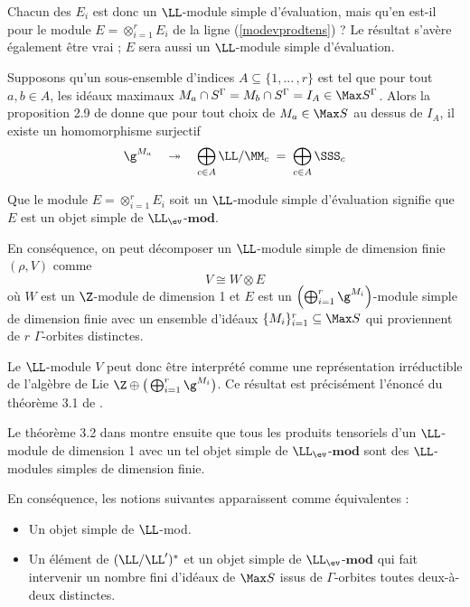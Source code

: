 Chacun des $E_i$ est donc un $\LL$-module simple d'évaluation, mais qu'en est-il pour le module $E = \otimes_{i=1}^r E_i$ de la ligne (\ref{modevprodtens}) ? Le résultat s'avère également être vrai ; $E$ sera aussi un $\LL$-module simple d'évaluation. 

Supposons qu'un sous-ensemble d'indices $A \subseteq \{1,...\,,r\}$ est tel que pour tout $a,b \in A$, les idéaux maximaux $M_a \cap S^\Gamma = M_b \cap S^\Gamma = I_A \in \Max S^\Gamma$. Alors la proposition 2.9 de \cite{LauTCA} donne que pour tout choix de $M_a \in \Max S$ au dessus de $I_A$, il existe un homomorphisme surjectif
\begin{equation} \label{surjectiontresobscure}
\g^{M_a} \quad \twoheadrightarrow \quad \bigoplus_{c \in A} \LL/\MM_c \; = \; \bigoplus_{c \in A} \SSS_c
\end{equation}

\begin{Rem} Que le module $E = \otimes_{i=1}^r E_i$ soit un $\LL$-module simple d'évaluation signifie que $E$ est un objet simple de $\LL_{\ev}$-$\mathbf{mod}$.
\end{Rem}

En conséquence, on peut décomposer un $\LL$-module simple de dimension finie $(\rho,V)$ comme
$$ V \cong W \otimes E $$
où $W$ est un $\Z$-module de dimension 1 et $E$ est un $\left(\bigoplus_{i=1}^r \g^{M_i}\right)$-module simple de dimension finie avec un ensemble d'idéaux $\{M_i\}_{i=1}^r \subseteq \Max S$ qui proviennent de $r$ $\Gamma$-orbites distinctes.

Le $\LL$-module $V$ peut donc être interprété comme une représentation irréductible de l'algèbre de Lie $\Z \oplus \big(\bigoplus_{i=1}^r \g^{M_i}\big)$. Ce résultat est précisément l'énoncé du théorème 3.1 de \cite{LauTCA}.
%

Le théorème 3.2 dans \cite{LauTCA} montre ensuite que tous les produits tensoriels d'un $\LL$-module de dimension 1 avec un tel objet simple de $\LL_{\ev}$-$\mathbf{mod}$ sont des $\LL$-modules simples de dimension finie.

\begin{Rem} \label{equivalencemodulesimple} En conséquence, les notions suivantes apparaissent comme équivalentes :
\begin{itemize}
\item[\em(1)] Un objet simple de $\LL$-mod.
\item[\em(2)] Un élément de $(\LL/\LL')^*$ et un objet simple de $\LL_{\ev}$-$\mathbf{mod}$ qui fait intervenir un nombre fini d'idéaux de $\Max S$ issus de $\Gamma$-orbites toutes deux-à-deux distinctes.
\end{itemize}
\end{Rem}

